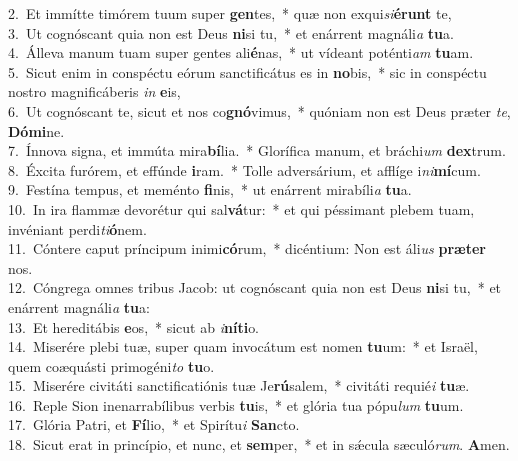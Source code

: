 {2.~}Et immítte timórem tuum super \textbf{gen}tes,~* quæ non exqui\textit{si}\textbf{é}\textbf{runt} te,\\
{3.~}Ut cognóscant quia non est Deus \textbf{ni}si tu,~* et enárrent magnáli\textit{a} \textbf{tu}a.\\
{4.~}Álleva manum tuam super gentes ali\textbf{é}nas,~* ut vídeant poténti\textit{am} \textbf{tu}am.\\
{5.~}Sicut enim in conspéctu eórum sanctificátus es in \textbf{no}bis,~* sic in conspéctu nostro magnificáberis \textit{in} \textbf{e}is,\\
{6.~}Ut cognóscant te, sicut et nos co\textbf{gnó}vimus,~* quóniam non est Deus præter \textit{te}, \textbf{Dó}\textbf{mi}ne.\\
{7.~}Ínnova signa, et immúta mira\textbf{bí}lia.~* Glorífica manum, et bráchi\textit{um} \textbf{dex}trum.\\
{8.~}Éxcita furórem, et effúnde \textbf{i}ram.~* Tolle adversárium, et afflíge i\textit{ni}\textbf{mí}cum.\\
{9.~}Festína tempus, et meménto \textbf{fi}nis,~* ut enárrent mirabíli\textit{a} \textbf{tu}a.\\
{10.~}In ira flammæ devorétur qui sal\textbf{vá}tur:~* et qui péssimant plebem tuam, invéniant perdi\textit{ti}\textbf{ó}nem.\\
{11.~}Cóntere caput príncipum inimi\textbf{có}rum,~* dicéntium: Non est áli\textit{us} \textbf{præ}\textbf{ter} nos.\\
{12.~}Cóngrega omnes tribus Jacob: ut cognóscant quia non est Deus \textbf{ni}si tu,~* et enárrent magnáli\textit{a} \textbf{tu}a:\\
{13.~}Et hereditábis \textbf{e}os,~* sicut ab \textit{i}\textbf{ní}\textbf{ti}o.\\
{14.~}Miserére plebi tuæ, super quam invocátum est nomen \textbf{tu}um:~* et Israël, quem coæquásti primogéni\textit{to} \textbf{tu}o.\\
{15.~}Miserére civitáti sanctificatiónis tuæ Je\textbf{rú}salem,~* civitáti requié\textit{i} \textbf{tu}æ.\\
{16.~}Reple Sion inenarrabílibus verbis \textbf{tu}is,~* et glória tua pópu\textit{lum} \textbf{tu}um.\\
{17.~}Glória Patri, et \textbf{Fí}lio,~* et Spirítu\textit{i} \textbf{San}cto.\\
{18.~}Sicut erat in princípio, et nunc, et \textbf{sem}per,~* et in sǽcula sæculó\textit{rum}. \textbf{A}men.\\

